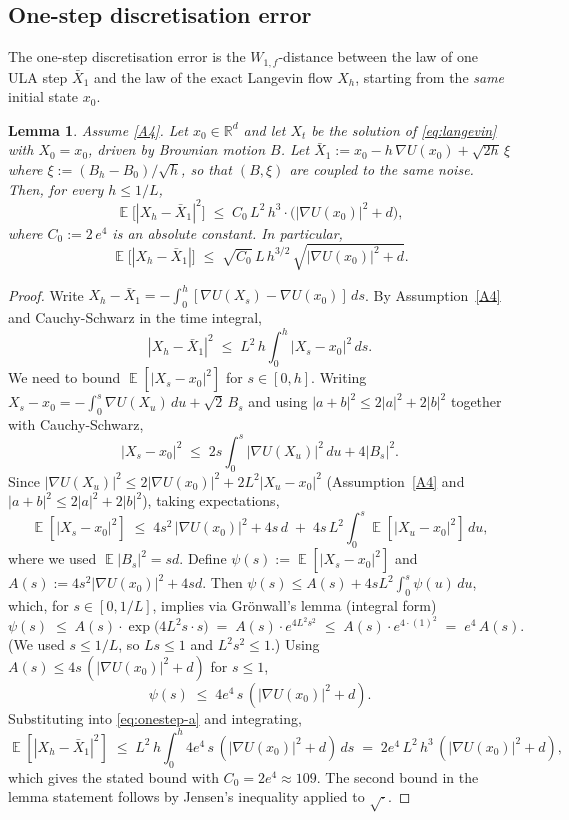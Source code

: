 \documentclass[11pt]{article}
\newtheorem{lemma}[theorem]{Lemma}
\theoremstyle{definition}
\DeclareMathOperator{\E}{\mathbb{E}}
\newcommand{\R}{\mathbb{R}}
\newcommand{\abs}[1]{\left\lvert #1 \right\rvert}
\begin{document}
\subsection{One-step discretisation error}

The one-step discretisation error is the $W_{1,f}$-distance between the law of one ULA step $\bar X_1$ and the law of the exact Langevin flow $X_h$, starting from the \emph{same} initial state $x_0$.

\begin{lemma}\label{lem:onestep-strong}
Assume \ref{A4}. Let $x_0 \in \R^d$ and let $X_t$ be the solution of \eqref{eq:langevin} with $X_0 = x_0$, driven by Brownian motion $B$. Let $\bar X_1 := x_0 - h\,\nabla U(x_0) + \sqrt{2h}\,\xi$ where $\xi := (B_h - B_0)/\sqrt h$, so that $(B, \xi)$ are coupled to the same noise. Then, for every $h \le 1/L$,
\[
\E\bigl[\abs{X_h - \bar X_1}^2\bigr] \;\le\; C_0\, L^2\, h^3 \cdot \bigl(\abs{\nabla U(x_0)}^2 + d\bigr),
\]
where $C_0 := 2\, e^4$ is an absolute constant. In particular,
\[
\E\bigl[\abs{X_h - \bar X_1}\bigr] \;\le\; \sqrt{C_0}\, L\, h^{3/2}\,\sqrt{\abs{\nabla U(x_0)}^2 + d}.
\]
\end{lemma}

\begin{proof}
Write $X_h - \bar X_1 = -\int_0^h [\nabla U(X_s) - \nabla U(x_0)]\,ds$. By Assumption~\ref{A4} and Cauchy-Schwarz in the time integral,
\begin{equation}\label{eq:onestep-a}
\abs{X_h - \bar X_1}^2 \;\le\; L^2\, h\int_0^h \abs{X_s - x_0}^2\,ds.
\end{equation}
We need to bound $\E[\abs{X_s - x_0}^2]$ for $s \in [0, h]$. Writing $X_s - x_0 = -\int_0^s \nabla U(X_u)\,du + \sqrt 2\,B_s$ and using $\abs{a + b}^2 \le 2\abs a^2 + 2\abs b^2$ together with Cauchy-Schwarz,
\[
\abs{X_s - x_0}^2 \;\le\; 2 s\int_0^s \abs{\nabla U(X_u)}^2\,du + 4\abs{B_s}^2.
\]
Since $\abs{\nabla U(X_u)}^2 \le 2\abs{\nabla U(x_0)}^2 + 2 L^2\abs{X_u - x_0}^2$ (Assumption~\ref{A4} and $\abs{a+b}^2 \le 2\abs a^2 + 2\abs b^2$), taking expectations,
\[
\E[\abs{X_s - x_0}^2] \;\le\; 4 s^2\,\abs{\nabla U(x_0)}^2 + 4 s\,d \;+\; 4 s\, L^2\int_0^s \E[\abs{X_u - x_0}^2]\,du,
\]
where we used $\E\abs{B_s}^2 = s d$. Define $\psi(s) := \E[\abs{X_s - x_0}^2]$ and $A(s) := 4 s^2\abs{\nabla U(x_0)}^2 + 4 s d$. Then $\psi(s) \le A(s) + 4 s L^2\int_0^s \psi(u)\,du$, which, for $s \in [0, 1/L]$, implies via Gr\"onwall's lemma (integral form)
\[
\psi(s) \;\le\; A(s)\cdot \exp\!\bigl(4 L^2 s \cdot s\bigr) \;=\; A(s)\cdot e^{4 L^2 s^2} \;\le\; A(s)\cdot e^{4 \cdot (1)^2} \;=\; e^4\, A(s).
\]
(We used $s \le 1/L$, so $L s \le 1$ and $L^2 s^2 \le 1$.) Using $A(s) \le 4 s\,(\abs{\nabla U(x_0)}^2 + d)$ for $s \le 1$,
\[
\psi(s) \;\le\; 4 e^4\, s\,(\abs{\nabla U(x_0)}^2 + d).
\]
Substituting into \eqref{eq:onestep-a} and integrating,
\[
\E[\abs{X_h - \bar X_1}^2] \;\le\; L^2\, h \int_0^h 4 e^4\, s\,(\abs{\nabla U(x_0)}^2 + d)\,ds \;=\; 2 e^4\, L^2\, h^3\,(\abs{\nabla U(x_0)}^2 + d),
\]
which gives the stated bound with $C_0 = 2 e^4 \approx 109$. The second bound in the lemma statement follows by Jensen's inequality applied to $\sqrt{\cdot}$.
\end{proof}
\end{document}
